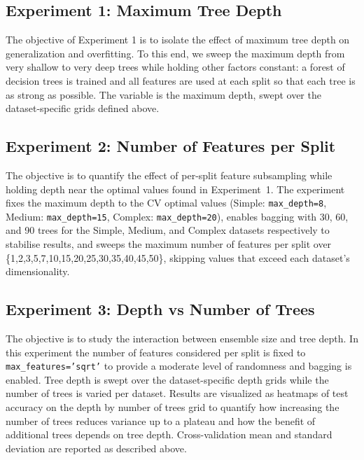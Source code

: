 \documentclass[conference]{IEEEtran}
\begin{document}
\subsection{Experiment 1: Maximum Tree Depth}
The objective of Experiment 1 is to isolate the effect of maximum tree depth on generalization and overfitting. To this end, we sweep the maximum depth from 
very shallow to very deep trees while holding other factors constant: a forest of decision trees is trained and all features are used at 
each split so that each tree is as strong as possible. The variable is the maximum depth, swept over the dataset-specific grids defined above.

\subsection{Experiment 2: Number of Features per Split}
The objective is to quantify the effect of per-split feature subsampling while holding depth near the optimal values found in Experiment~1. The experiment fixes the maximum depth to 
the CV optimal values (Simple: \texttt{max\_depth=8}, Medium: \texttt{max\_depth=15}, Complex: \texttt{max\_depth=20}), enables bagging with 30, 60, and 90 trees for the Simple, Medium, 
and Complex datasets respectively to stabilise results, and sweeps the maximum number of features per split over \{1,2,3,5,7,10,15,20,25,30,35,40,45,50\}, skipping values that 
exceed each dataset's dimensionality.
\subsection{Experiment 3: Depth vs Number of Trees}
The objective is to study the interaction between ensemble size and tree depth. In this experiment the number of features considered per split is fixed
 to \texttt{max\_features='sqrt'} to provide a moderate level of randomness and bagging is enabled. Tree depth is swept over the dataset-specific depth grids while the number of
  trees is varied per dataset. Results are visualized as heatmaps of test accuracy on the depth by number of trees grid to quantify how increasing the number of trees reduces variance up to a plateau and how the benefit of additional trees depends on tree depth. Cross-validation mean and standard deviation are reported as described above.
\end{document}
